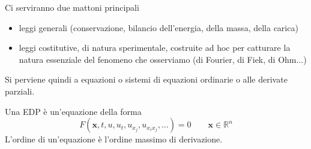 \documentclass[10pt,a4paper,twoside,openright]{book}
\begin{document}
Ci serviranno due mattoni principali
\begin{itemize}
\item leggi generali (conservazione, bilancio dell'energia, della massa, della carica)
\item leggi costitutive, di natura sperimentale, costruite ad hoc per catturare la natura essenziale del fenomeno che osserviamo (di Fourier, di Fiek, di Ohm...)
\end{itemize}

Si perviene quindi a equazioni o sistemi di equazioni ordinarie o alle derivate parziali.

Una EDP è un'equazione della forma
\begin{equation*}
F( \mathbf{x},t,u,u_{t},u_{x_{j}},u_{x_{i} x_{j}},\dotsc)=0 \qquad \mathbf{x}\in \mathbb{R} ^{n} 
\end{equation*}
L'ordine di un'equazione è l'ordine massimo di derivazione.
\end{document}
